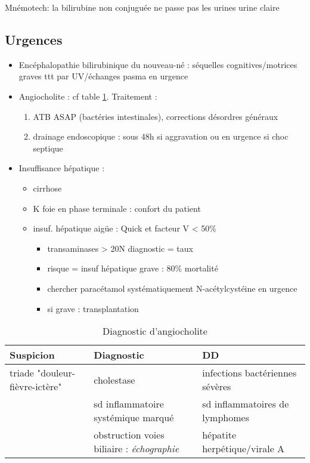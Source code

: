\documentclass[11pt]{article}
\begin{document}
Mnémotech: la bilirubine non conjuguée ne passe pas les urines \thus urine claire

\subsection{Urgences}
\label{sec:orgd6d11a6}
\begin{itemize}
\item Encéphalopathie bilirubinique du nouveau-né : séquelles cognitives/motrices
graves \thus ttt par UV/échanges pasma en urgence \faBomb
\item Angiocholite : cf table \ref{tab:org8a00f57}. Traitement :
\begin{enumerate}
\item ATB ASAP (bactéries intestinales), corrections désordres généraux
\item drainage endoscopique : sous 48h si aggravation ou en urgence si choc
septique \faBomb
\end{enumerate}
\item Insuffisance hépatique :
\begin{itemize}
\item cirrhose
\item K foie en phase terminale : confort du patient
\item insuf. hépatique aigüe : 
Quick et facteur V < 50\%
\begin{itemize}
\item transaminases > 20N \thus diagnostic = \dec taux
\item risque = insuf hépatique grave : 80\% mortalité \faBomb
\item chercher paracétamol systématiquement \thus N-acétylcystéine en urgence
\item si grave : transplantation
\end{itemize}
\end{itemize}
\end{itemize}

\begin{table}[htbp]
\caption{\label{tab:org8a00f57}
Diagnostic d'angiocholite}
\centering
\begin{tabular}{lll}
\toprule
Suspicion & Diagnostic & DD\\
\midrule
triade "douleur-fièvre-ictère" & cholestase & infections bactériennes sévères\\
 & sd inflammatoire systémique marqué & sd inflammatoires de lymphomes\\
 & obstruction voies biliaire : \emph{échographie} & hépatite herpétique/virale A\\
\bottomrule
\end{tabular}
\end{table}
\end{document}
